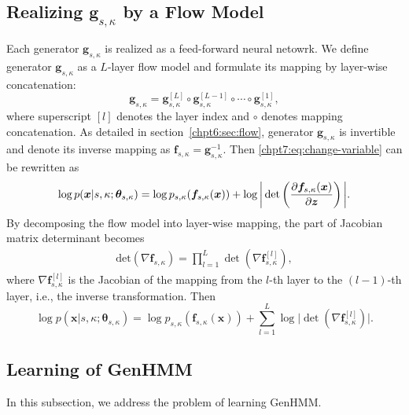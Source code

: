 \subsection{Realizing $\bm{g}_{s,\kappa}$ by a Flow Model}
Each generator $\bm{g}_{s,\kappa}$ is realized as a feed-forward neural netowrk.
We define generator $\bm{g}_{s,\kappa}$ as a $L$-layer flow model and formulate its mapping by layer-wise concatenation:
\begin{equation}
\bm{g}_{s,\kappa}=\bm{g}_{s,\kappa}^{[L]}\circ \bm{g}_{s,\kappa}^{[L-1]}\circ \cdots \circ \bm{g}_{s,\kappa}^{[1]},
\end{equation}
where superscript $[l]$ denotes the layer index and $\circ$ denotes mapping concatenation. As detailed in section~\ref{chpt6:sec:flow}, generator $\bm{g}_{s,\kappa}$ is invertible and denote its inverse mapping as $\bm{f}_{s,\kappa}=\bm{g}_{s,\kappa}^{-1}$. Then \eqref{chpt7:eq:change-variable} can be rewritten as
\begin{equation}\label{chpt7:eq:change-variable-flow}
  \log{p(\bm{x}| s, \kappa; \bm{\theta}_{s, \kappa})} = \log{p_{s,\kappa}(\bm{f}_{s, \kappa}(\bm{x}))} + \log{\bigg| \det\left(  \frac{ \partial \bm{f}_{s,\kappa}(\bm{x})}{\partial \bm{z}}  \right)\bigg|}.
\end{equation}
By decomposing the flow model into layer-wise mapping, the part of Jacobian matrix determinant becomes
\begin{equation}\label{eq:cat-jacobian}
  \begin{array}{rl}
    \mathrm{det}(\nabla{\bm{f}_{s,\kappa}}) = \prod_{l=1}^L \det (\nabla{\bm{f}_{s,\kappa}^{[l]}}),
  \end{array}
\end{equation}
where $\nabla{\bm{f}_{s,\kappa}^{[l]}}$ is the Jacobian of the mapping from the $l$-th layer to the $(l-1)$-th layer, i.e., the inverse transformation.
Then
\begin{equation}\label{chpt7:eq:change-variable-flow-layer}
  \log{p(\bm{x}| s, \kappa; \bm{\theta}_{s, \kappa})} = \log{p_{s,\kappa}(\bm{f}_{s, \kappa}(\bm{x}))} + \sum_{l=1}^{L}\log{\bigg| \det\left(\nabla{\bm{f}_{s,\kappa}^{[l]}}\right)\bigg|}.
\end{equation}


\subsection{Learning of GenHMM}\label{subsec:optmGenHMM}
In this subsection, we address the problem of learning GenHMM.
